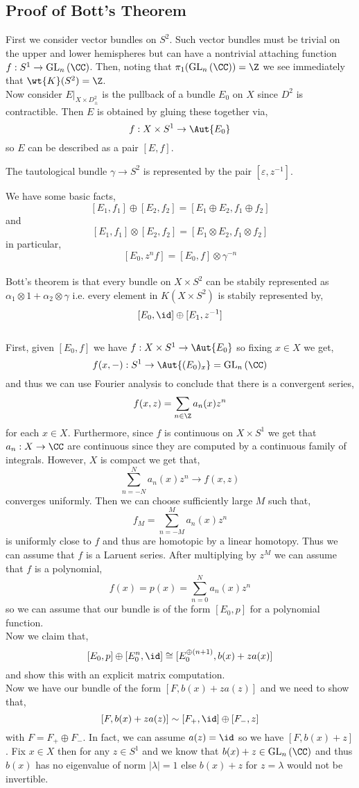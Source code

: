 \documentclass[12pt]{extarticle}
\newcommand{\GL}[2]{\mathrm{GL}_{#1} \left( #2 \right)}
\begin{document}
\subsection{Proof of Bott's Theorem}

First we consider vector bundles on $S^2$. Such vector bundles must be trivial on the upper and lower hemispheres but can have a nontrivial attaching function $f : S^1 \to \GL{n}{\CC}$.  Then, noting that $\pi_1(\GL{n}{\CC}) = \Z$  we see immediately that $\wt{K}(S^2) = \Z$. 
\bigskip\\
Now consider $E |_{X \times D^2_{\pm}}$ is the pullback of a bundle $E_0$ on $X$ since $D^2$ is contractible. Then $E$ is obtained by gluing these together via,
\[ f : X \times S^1 \to \Aut{E_0} \]
so $E$ can be described as a pair $[E, f]$. 
\begin{example}
The tautological bundle $\gamma \to S^2$ is represented by the pair $[\varepsilon, z^{-1}]$. 
\end{example}
\noindent
We have some basic facts,
\[ [E_1, f_1] \oplus [E_2, f_2] = [E_1 \oplus E_2, f_1 \oplus f_2] \]
and
\[ [E_1, f_1] \otimes [E_2, f_2] = [E_1 \otimes E_2, f_1 \otimes f_2] \]
in particular,
\[ [E_0, z^n f] = [E_0, f] \otimes \gamma^{-n} \]
\bigskip\\
Bott's theorem is that every bundle on $X \times S^2$ can be stabily represented as $\alpha_1 \otimes 1 + \alpha_2 \otimes \gamma$ i.e. every element in $K(X \times S^2)$ is stabily represented by,
\[ [E_0, \id] \oplus [E_1, z^{-1} ] \]
\bigskip\\
First, given $[E_0, f]$ we have $f : X \times S^1 \to \Aut{E_0}$ so fixing $x \in X$ we get,
\[ f(x, -) : S^1 \to \Aut{(E_0)_x} = \GL{n}{\CC} \]
and thus we can use Fourier analysis to conclude that there is a convergent series,
\[ f(x, z) = \sum_{n \in \Z} a_n(x) z^n \] 
for each $x \in X$. Furthermore, since $f$ is continuous on $X \times S^1$ we get that $a_n : X \to \CC$ are continuous since they are computed by a continuous family of integrals. However, $X$ is compact we get that,
\[ \sum_{n = -N}^N a_n(x) z^n \to f(x, z) \]
converges uniformly. Then we can choose sufficiently large $M$ such that,
\[ f_M = \sum_{n = - M}^M a_n(x) z^n \]
is uniformly close to $f$ and thus are homotopic by a linear homotopy. Thus we can assume that $f$ is a Laruent series. After multiplying by $z^M$ we can assume that $f$ is a polynomial,
\[ f(x) = p(x) = \sum_{n = 0}^N a_n(x) z^n \]
so we can assume that our bundle is of the form $[E_0, p]$ for a polynomial function. 
\bigskip\\
Now we claim that,
\[ [E_0, p] \oplus [E_0^n, \id] \cong [E_0^{\oplus (n+1)}, b(x) + z a(x)] \]
and show this with an explicit matrix computation.
\bigskip\\
Now we have our bundle of the form $[F, b(x) + z a(z)]$ and we need to show that,
\[ [F, b(x) + z a(z)] \sim [F_{+}, \id] \oplus [F_{-}, z ] \]
with $F = F_{+} \oplus F_{-}$. In fact, we can assume $a(z) = \id$ so we have $[F, b(x) + z]$. Fix $x \in X$ then for any $z \in S^1$ and we know that $b(x) + z \in \GL{n}{\CC}$ and thus $b(x)$ has no eigenvalue of norm $|\lambda| = 1$ else $b(x) + z$ for $z = \lambda$ would not be invertible. 
\end{document}
